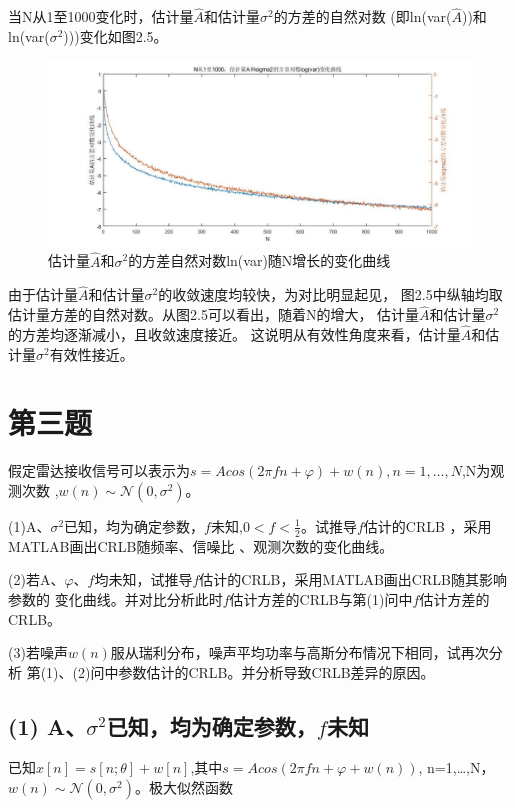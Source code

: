 \documentclass[fontset=windows]{article}
\numberwithin{figure}{section}
\begin{document}
当N从1至1000变化时，估计量\(\hat{A}\)和估计量\(\sigma^2\)的方差的自然对数
(即ln(var(\(\hat{A}\)))和ln(var(\(\sigma^2\))))变化如图2.5。

\begin{figure}[H]
	\centering
	\includegraphics[scale=0.4]{fig2.5.jpg}
	\caption{估计量\(\hat{A}\)和\(\sigma^2\)的方差自然对数ln(var)随N增长的变化曲线}
	\label{2.5}
\end{figure}

由于估计量\(\hat{A}\)和估计量\(\sigma^2\)的收敛速度均较快，为对比明显起见，
图2.5中纵轴均取估计量方差的自然对数。从图2.5可以看出，随着N的增大，
估计量\(\hat{A}\)和估计量\(\sigma^2\)的方差均逐渐减小，且收敛速度接近。
这说明从有效性角度来看，估计量\(\hat{A}\)和估计量\(\sigma^2\)有效性接近。

\section{第三题}
假定雷达接收信号可以表示为\(s=Acos(2\pi fn+\varphi)+w(n),n=1,…,N\),N为观测次数
,\(w(n)\sim\mathcal{N}(0,\sigma^2)\)。

(1)A、\(\sigma^2\)已知，均为确定参数，\(f\)未知,\(0<f<\frac{1}{2}\)。试推导\(f\)估计的CRLB
，采用MATLAB画出CRLB随频率、信噪比 、观测次数的变化曲线。

(2)若A、\(\varphi\)、\(f\)均未知，试推导\(f\)估计的CRLB，采用MATLAB画出CRLB随其影响参数的
变化曲线。并对比分析此时\(f\)估计方差的CRLB与第(1)问中\(f\)估计方差的CRLB。

(3)若噪声\(w(n)\)服从瑞利分布，噪声平均功率与高斯分布情况下相同，试再次分析
第(1)、(2)问中参数估计的CRLB。并分析导致CRLB差异的原因。

\subsection*{(1) A、\(\sigma^2\)已知，均为确定参数，\(f\)未知}

已知\(x[n]=s[n;\theta]+w[n]\),其中\(s=Acos(2\pi f n +\varphi + w(n))\),
n=1,…,N，\(w(n)\sim \mathcal{N} (0,\sigma^2)\)。极大似然函数
\end{document}
